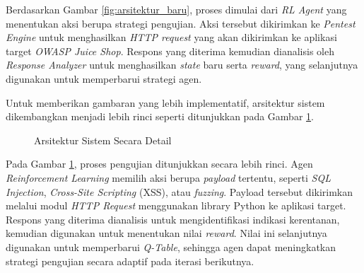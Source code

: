 Berdasarkan Gambar \ref{fig:arsitektur_baru}, proses dimulai dari \textit{RL Agent} yang menentukan aksi berupa strategi pengujian. Aksi tersebut dikirimkan ke \textit{Pentest Engine} untuk menghasilkan \textit{HTTP request} yang akan dikirimkan ke aplikasi target \textit{OWASP Juice Shop}. Respons yang diterima kemudian dianalisis oleh \textit{Response Analyzer} untuk menghasilkan \textit{state} baru serta \textit{reward}, yang selanjutnya digunakan untuk memperbarui strategi agen.

Untuk memberikan gambaran yang lebih implementatif, arsitektur sistem dikembangkan menjadi lebih rinci seperti ditunjukkan pada Gambar \ref{fig:arsitektur_detail}.

\begin{figure}[h!]
\centering
{}
\caption{Arsitektur Sistem Secara Detail}
\label{fig:arsitektur_detail}
\end{figure}

Pada Gambar \ref{fig:arsitektur_detail}, proses pengujian ditunjukkan secara lebih rinci. Agen \textit{Reinforcement Learning} memilih aksi berupa \textit{payload} tertentu, seperti \textit{SQL Injection}, \textit{Cross-Site Scripting} (XSS), atau \textit{fuzzing}. Payload tersebut dikirimkan melalui modul \textit{HTTP Request} menggunakan library Python ke aplikasi target. Respons yang diterima dianalisis untuk mengidentifikasi indikasi kerentanan, kemudian digunakan untuk menentukan nilai \textit{reward}. Nilai ini selanjutnya digunakan untuk memperbarui \textit{Q-Table}, sehingga agen dapat meningkatkan strategi pengujian secara adaptif pada iterasi berikutnya.

